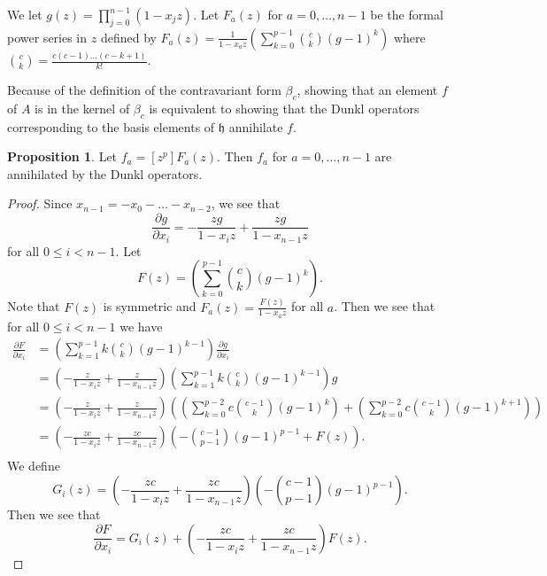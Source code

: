 \documentclass{amsart}
\numberwithin{equation}{section}
\theoremstyle{definition}
\newtheorem{proposition}[equation]{Proposition}
\newcommand{\h}{\mathfrak{h}}
\begin{document}
We let $g(z)=\prod_{j=0}^{n-1} (1-x_jz)$. Let $F_a(z)$ for $a=0,\dots,n-1$ be the formal power series in $z$ defined by $F_a(z)=\frac{1}{1-x_az} \left( \sum_{k=0}^{p-1} \binom{c}{k}(g-1)^k\right)$ where $\binom{c}{k}=\frac{c(c-1)\dots(c-k+1)}{k!}$. 

Because of the definition of the contravariant form $\beta_c$, showing that an element $f$ of $A$ is in the kernel of $\beta_c$ is equivalent to showing that the Dunkl operators corresponding to the basis elements of $\h$ annihilate $f$.

\begin{proposition}\label{prop:ann} Let $f_a=[z^p]F_a(z)$. Then $f_a$ for $a=0,\dots,n-1$ are annihilated by the Dunkl operators. 
\end{proposition}

\begin{proof}
Since $x_{n-1}=-x_0-\dots-x_{n-2}$, we see that $$\frac{\partial g}{\partial x_i}=-\frac{zg}{1-x_iz}+\frac{zg}{1-x_{n-1}z}$$ for all $0 \le i < n-1$. Let $$F(z) =\left(\sum_{k=0}^{p-1} \binom{c}{k} (g-1)^k\right).$$ Note that $F(z)$ is symmetric and $F_a(z)=\frac{F(z)}{1-x_az}$ for all $a$. Then we see that for all $0 \le i < n-1$ we have 
\begin{align*}
\frac{\partial F}{\partial x_i}%
&=\left(\sum_{k=1}^{p-1}k\binom{c}{k}(g-1)^{k-1}\right)\frac{\partial g}{\partial x_i}\\
&=\left(-\frac{z}{1-x_iz}+\frac{z}{1-x_{n-1}z}\right)\left(\sum_{k=1}^{p-1}k\binom{c}{k}(g-1)^{k-1}\right)g\\
&=\left(-\frac{z}{1-x_iz}+\frac{z}{1-x_{n-1}z}\right)\left(\left(\sum_{k=0}^{p-2}c\binom{c-1}{k}(g-1)^{k}\right)+\left(\sum_{k=0}^{p-2}c\binom{c-1}{k}(g-1)^{k+1}\right)\right)\\
&=\left(-\frac{zc}{1-x_iz}+\frac{zc}{1-x_{n-1}z}\right)\left(-\binom{c-1}{p-1}(g-1)^{p-1}+F(z)\right).\\
\end{align*}
We define $$G_i(z)=\left(-\frac{zc}{1-x_iz}+\frac{zc}{1-x_{n-1}z}\right)\left(-\binom{c-1}{p-1}(g-1)^{p-1}\right).$$ Then we see that $$\frac{\partial F}{\partial x_i}=G_i(z)+\left(-\frac{zc}{1-x_iz}+\frac{zc}{1-x_{n-1}z}\right)F(z).$$


\end{proof}
\end{document}
